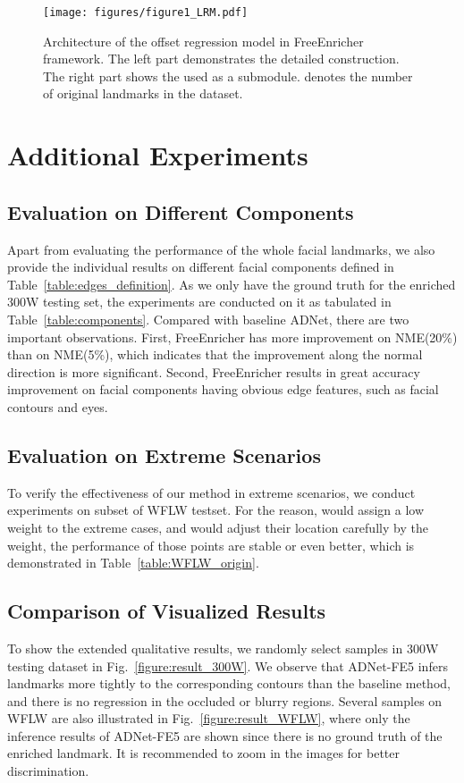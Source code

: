 \documentclass[letterpaper]{article} \usepackage{aaai23}  \usepackage{times}  \usepackage{helvet}  \usepackage{courier}  \usepackage[hyphens]{url}  \usepackage{graphicx} \urlstyle{rm} \def\UrlFont{\rm}  \usepackage{natbib}  \usepackage{caption} \frenchspacing  \setlength{\pdfpagewidth}{8.5in}  \setlength{\pdfpageheight}{11in}  \usepackage{algorithm}
\begin{document}
\begin{figure}[b!]
\centering
\texttt{[image: figures/figure1\_LRM.pdf]}
\caption{Architecture of the offset regression model in FreeEnricher framework.
The left part demonstrates the detailed construction. The right part shows the  used as a submodule.  denotes the number of original landmarks in the dataset.
}
\label{figure:architecture_LRM}
\end{figure}


\section{Additional Experiments}

\subsection{Evaluation on Different Components}
Apart from evaluating the performance of the whole facial landmarks, we also provide the individual results on different facial components defined in Table~\ref{table:edges_definition}.
As we only have the ground truth for the enriched 300W testing set, the experiments are conducted on it as tabulated in Table~\ref{table:components}.
Compared with baseline ADNet, there are two important observations. First, FreeEnricher has more improvement on NME(20\%) than on NME(5\%), which indicates that the improvement along the normal direction is more significant. Second, FreeEnricher results in great accuracy improvement on facial components having obvious edge features, such as facial contours and eyes.

\subsection{Evaluation on Extreme Scenarios}
To verify the effectiveness of our method in extreme scenarios, we conduct experiments on subset of WFLW testset.
For the reason,  would assign a low weight to the extreme cases, and  would adjust their location carefully by the weight, the performance of those points are stable or even better, which is demonstrated in Table~\ref{table:WFLW_origin}.

\subsection{Comparison of Visualized Results}
To show the extended qualitative results, we randomly select samples in 300W testing dataset in Fig.~\ref{figure:result_300W}.
We observe that ADNet-FE5 infers landmarks more tightly to the corresponding contours than the baseline method, and there is no regression in the occluded or blurry regions.
Several samples on WFLW are also illustrated in Fig.~\ref{figure:result_WFLW}, where only the inference results of ADNet-FE5 are shown since there is no ground truth of the enriched landmark.
It is recommended to zoom in the images for better discrimination.
\end{document}
